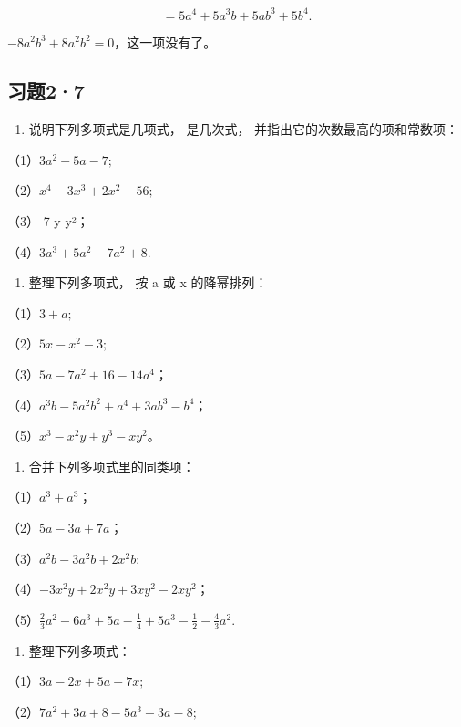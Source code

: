 \[
= 5 a ^{4} + 5 a ^{3} b + 5 a b ^{3} + 5 b ^{4}.
\]

\(-8a^{2}b^{3} + 8a^{2}b^{2} = 0\)，这一项没有了。

\subsection{习题2·7}

\begin{enumerate}
\item
  说明下列多项式是几项式， 是几次式， 并指出它的次数最高的项和常数项：
\end{enumerate}

（1）\(3a^{2} - 5a - 7;\)

（2）\(x^{4} - 3x^{3} + 2x^{2} - 56;\)

（3） 7-y-y²；

（4）\(3a^{3} + 5a^{2} - 7a^{2} + 8.\)

\begin{enumerate}[start=2]
\item
  整理下列多项式， 按 a 或 x 的降幂排列：
\end{enumerate}

（1）\(3 + a;\)

（2）\(5x - x^{2} - 3;\)

（3）\(5a - 7a^{2} + 16 - 14a^{4}\)；

（4）\(a^3 b - 5a^2 b^2 + a^4 + 3ab^3 - b^4\)；

（5）\(x^{3} - x^{2}y + y^{3} - xy^{2}\)。

\begin{enumerate}[start=3]
\item
  合并下列多项式里的同类项：
\end{enumerate}

（1）\(a^3 + a^3\)；

（2）\(5a - 3a + 7a\)；

（3）\(a^2 b - 3a^2 b + 2x^2 b;\)

（4）\(-3x^{2}y + 2x^{2}y + 3xy^{2} - 2xy^{2}\)；

（5）\(\frac{2}{3} a^2 - 6a^3 + 5a - \frac{1}{4} + 5a^3 - \frac{1}{2} - \frac{4}{3} a^2.\)

\begin{enumerate}[start=4]
\item
  整理下列多项式：
\end{enumerate}

（1）\(3a - 2x + 5a - 7x;\)

（2）\(7a^{2} + 3a + 8 - 5a^{3} - 3a - 8;\)


